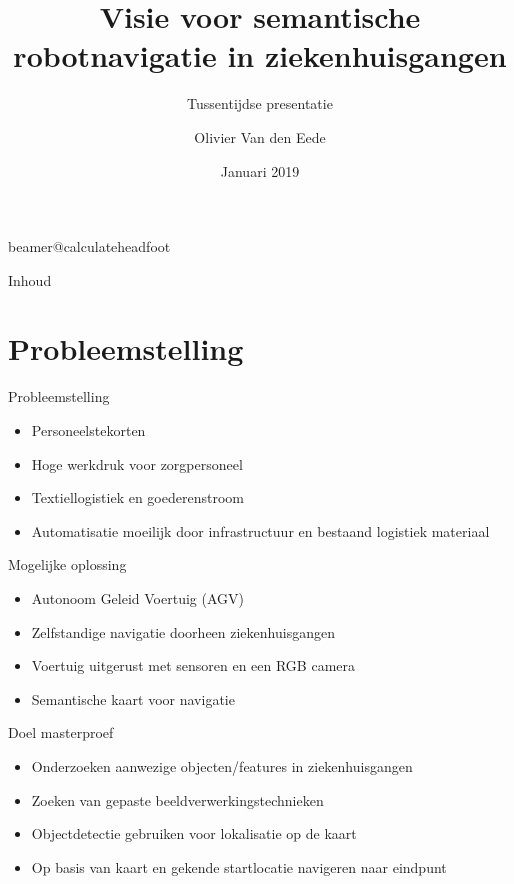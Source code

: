 \documentclass[11pt,t]{beamer}
\title[Tussentijdse presentatie]{Visie voor semantische robotnavigatie in ziekenhuisgangen} %
\subtitle{Tussentijdse presentatie}
\author{Olivier Van den Eede}
\institute{KU Leuven - De Nayer}
\date{Januari 2019}
\begin{document}
\csname beamer@calculateheadfoot\endcsname %

\begin{frame}
	\titlepage
\end{frame}
	

\begin{frame}{Inhoud}
	\hfill	{\large \parbox{.961\textwidth}{\tableofcontents[hideothersubsections]}}
\end{frame}



\section{Probleemstelling}
\begin{frame}[fragile]{Probleemstelling}
	\begin{itemize}
		\item Personeelstekorten
		\item Hoge werkdruk voor zorgpersoneel
		\item Textiellogistiek en goederenstroom
		\item Automatisatie moeilijk door infrastructuur en bestaand logistiek materiaal
	\end{itemize}
\end{frame}

\begin{frame}[fragile]{Mogelijke oplossing}
	\begin{itemize}
		\item Autonoom Geleid Voertuig (AGV)
		\item Zelfstandige navigatie doorheen ziekenhuisgangen
		\item Voertuig uitgerust met sensoren en een RGB camera
		\item Semantische kaart voor navigatie
	\end{itemize}
\end{frame}

\begin{frame}[fragile]{Doel masterproef}
	\begin{itemize}
		\item Onderzoeken aanwezige objecten/features in ziekenhuisgangen
		\item Zoeken van gepaste beeldverwerkingstechnieken
		\item Objectdetectie gebruiken voor lokalisatie op de kaart
		\item Op basis van kaart en gekende startlocatie navigeren naar eindpunt
	\end{itemize}
\end{frame}
\end{document}
